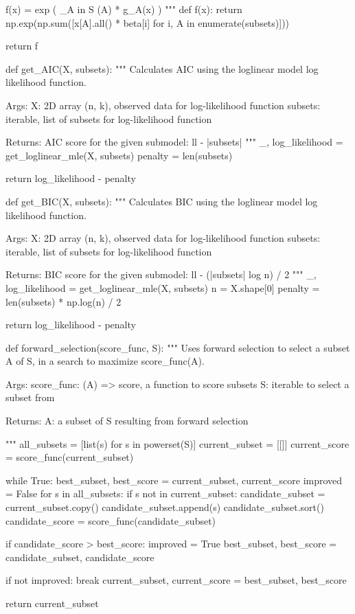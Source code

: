\begin{python}
    f(x) = exp ( \sum_{A in S} \beta(A) * g_A(x) )
    """
    def f(x):
        return np.exp(np.sum([x[A].all() * beta[i] for i, A in enumerate(subsets)]))
    
    return f


def get_AIC(X, subsets):
    """ 
    Calculates AIC using the loglinear model log likelihood function.
    
    Args:
       X:        2D array (n, k), observed data for log-likelihood function
       subsets:  iterable, list of subsets for log-likelihood function
       
    Returns:
       AIC score for the given submodel:  ll - |subsets|
    """
    _, log_likelihood = get_loglinear_mle(X, subsets)
    penalty = len(subsets)
    
    return log_likelihood - penalty


def get_BIC(X, subsets):
    """ 
    Calculates BIC using the loglinear model log likelihood function.
    
    Args:
       X:        2D array (n, k), observed data for log-likelihood function
       subsets:  iterable, list of subsets for log-likelihood function
       
    Returns:
       BIC score for the given submodel:  ll - (|subsets| log n) / 2
    """
    _, log_likelihood = get_loglinear_mle(X, subsets)
    n = X.shape[0]
    penalty = len(subsets) * np.log(n) / 2
    
    return log_likelihood - penalty
\end{python}

\begin{python}
def forward_selection(score_func, S):
    """
    Uses forward selection to select a subset A of S, in a search to maximize score_func(A).

    Args:
       score_func:  (A) => score, a function to score subsets
       S:           iterable to select a subset from
       
    Returns:
       A:           a subset of S resulting from forward selection
       
    """
    all_subsets = [list(s) for s in powerset(S)]
    current_subset = [[]]
    current_score = score_func(current_subset)
    
    while True:
        best_subset, best_score = current_subset, current_score
        improved = False
        for s in all_subsets:
            if s not in current_subset:
                candidate_subset = current_subset.copy()
                candidate_subset.append(s)
                candidate_subset.sort()
                candidate_score = score_func(candidate_subset)
                
                if candidate_score > best_score:
                    improved = True
                    best_subset, best_score = candidate_subset, candidate_score
        
        if not improved:
            break
        current_subset, current_score = best_subset, best_score
    
    return current_subset
\end{python}

